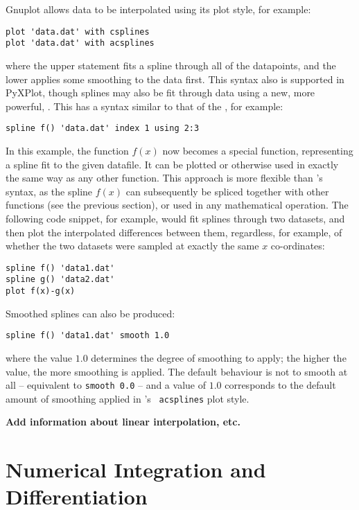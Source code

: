 Gnuplot allows data to be interpolated using its  plot style,
for example:

\begin{verbatim}
plot 'data.dat' with csplines
plot 'data.dat' with acsplines
\end{verbatim}

\noindent where the upper statement fits a spline through all of the
datapoints, and the lower applies some smoothing to the data first. This syntax
also is supported in PyXPlot, though splines may also be fit through data using
a new, more powerful, . This has a syntax similar to that of
the , for example:

\begin{verbatim}
spline f() 'data.dat' index 1 using 2:3
\end{verbatim}

\noindent In this example, the function $f(x)$ now becomes a special function,
representing a spline fit to the given datafile. It can be plotted or otherwise
used in exactly the same way as any other function. This approach is more
flexible than \gnuplot's syntax, as the spline $f(x)$ can subsequently be
spliced together with other functions (see the previous section), or used in
any mathematical operation.  The following code snippet, for example, would fit
splines through two datasets, and then plot the interpolated differences
between them, regardless, for example, of whether the two datasets were sampled
at exactly the same $x$ co-ordinates:

\begin{verbatim}
spline f() 'data1.dat'
spline g() 'data2.dat'
plot f(x)-g(x)
\end{verbatim}

Smoothed splines can also be produced:

\begin{verbatim}
spline f() 'data1.dat' smooth 1.0
\end{verbatim}

\noindent where the value $1.0$ determines the degree of smoothing to apply;
the higher the value, the more smoothing is applied. The default behaviour is
not to smooth at all -- equivalent to {\tt smooth 0.0} -- and a value of $1.0$
corresponds to the default amount of smoothing applied in \gnuplot's {\tt
acsplines} plot style.

{\bf Add information about linear interpolation, etc.}

\section{Numerical Integration and Differentiation}

